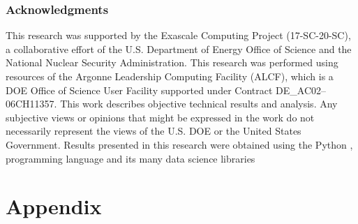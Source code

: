 \documentclass{article} %
\begin{document}
\subsubsection*{Acknowledgments}
This research was supported by the Exascale Computing Project (17-SC-20-SC), a collaborative effort of the U.S. Department of Energy Office of Science and the National Nuclear Security Administration.
This research was performed using resources of the Argonne Leadership Computing Facility (ALCF), which is a DOE Office of Science User
Facility supported under Contract DE\_AC02--06CH11357. 
%
This work describes objective technical results and analysis.
%
Any subjective views or opinions that might be expressed in the work do not necessarily represent the views of the U.S.
DOE or the United States Government.
%
Results presented in this research were obtained using the Python \citep{van1995python}, programming language and its
many data science libraries
\citep{matplotlib,numpyharris2020array,tensorflow2015-whitepaper,seaborn_michael_waskom_2017_883859,ipython4160251,arviz_2019}

%




\appendix
\section{Appendix}
%
\end{document}
